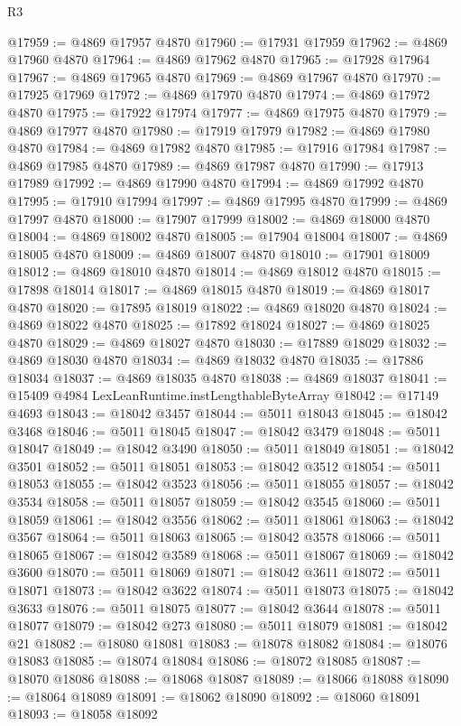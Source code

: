 \begin{lexlean}{R3}
\begin{coremodule}
@17959 := @4869 @17957 @4870
@17960 := @17931 @17959
@17962 := @4869 @17960 @4870
@17964 := @4869 @17962 @4870
@17965 := @17928 @17964
@17967 := @4869 @17965 @4870
@17969 := @4869 @17967 @4870
@17970 := @17925 @17969
@17972 := @4869 @17970 @4870
@17974 := @4869 @17972 @4870
@17975 := @17922 @17974
@17977 := @4869 @17975 @4870
@17979 := @4869 @17977 @4870
@17980 := @17919 @17979
@17982 := @4869 @17980 @4870
@17984 := @4869 @17982 @4870
@17985 := @17916 @17984
@17987 := @4869 @17985 @4870
@17989 := @4869 @17987 @4870
@17990 := @17913 @17989
@17992 := @4869 @17990 @4870
@17994 := @4869 @17992 @4870
@17995 := @17910 @17994
@17997 := @4869 @17995 @4870
@17999 := @4869 @17997 @4870
@18000 := @17907 @17999
@18002 := @4869 @18000 @4870
@18004 := @4869 @18002 @4870
@18005 := @17904 @18004
@18007 := @4869 @18005 @4870
@18009 := @4869 @18007 @4870
@18010 := @17901 @18009
@18012 := @4869 @18010 @4870
@18014 := @4869 @18012 @4870
@18015 := @17898 @18014
@18017 := @4869 @18015 @4870
@18019 := @4869 @18017 @4870
@18020 := @17895 @18019
@18022 := @4869 @18020 @4870
@18024 := @4869 @18022 @4870
@18025 := @17892 @18024
@18027 := @4869 @18025 @4870
@18029 := @4869 @18027 @4870
@18030 := @17889 @18029
@18032 := @4869 @18030 @4870
@18034 := @4869 @18032 @4870
@18035 := @17886 @18034
@18037 := @4869 @18035 @4870
@18038 := @4869 @18037
@18041 := @15409 @4984 LexLeanRuntime.instLengthableByteArray
@18042 := @17149 @4693
@18043 := @18042 @3457
@18044 := @5011 @18043
@18045 := @18042 @3468
@18046 := @5011 @18045
@18047 := @18042 @3479
@18048 := @5011 @18047
@18049 := @18042 @3490
@18050 := @5011 @18049
@18051 := @18042 @3501
@18052 := @5011 @18051
@18053 := @18042 @3512
@18054 := @5011 @18053
@18055 := @18042 @3523
@18056 := @5011 @18055
@18057 := @18042 @3534
@18058 := @5011 @18057
@18059 := @18042 @3545
@18060 := @5011 @18059
@18061 := @18042 @3556
@18062 := @5011 @18061
@18063 := @18042 @3567
@18064 := @5011 @18063
@18065 := @18042 @3578
@18066 := @5011 @18065
@18067 := @18042 @3589
@18068 := @5011 @18067
@18069 := @18042 @3600
@18070 := @5011 @18069
@18071 := @18042 @3611
@18072 := @5011 @18071
@18073 := @18042 @3622
@18074 := @5011 @18073
@18075 := @18042 @3633
@18076 := @5011 @18075
@18077 := @18042 @3644
@18078 := @5011 @18077
@18079 := @18042 @273
@18080 := @5011 @18079
@18081 := @18042 @21
@18082 := @18080 @18081
@18083 := @18078 @18082
@18084 := @18076 @18083
@18085 := @18074 @18084
@18086 := @18072 @18085
@18087 := @18070 @18086
@18088 := @18068 @18087
@18089 := @18066 @18088
@18090 := @18064 @18089
@18091 := @18062 @18090
@18092 := @18060 @18091
@18093 := @18058 @18092

\end{coremodule}
\end{lexlean}
